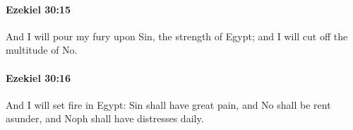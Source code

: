 		\paragraph{Ezekiel 30:15} %
			\label{EZEKIEL-30-15}

			And I will pour my fury upon Sin, the strength of Egypt; and I will cut off the multitude of No.


		\paragraph{Ezekiel 30:16} %
			\label{EZEKIEL-30-16}

			And I will set fire in Egypt: Sin shall have great pain, and No shall be rent asunder, and Noph shall have distresses daily.


